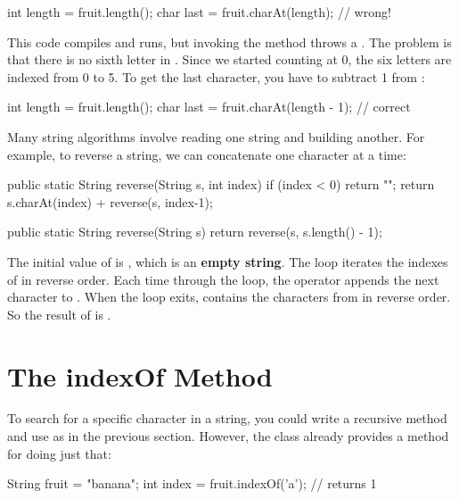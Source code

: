 \begin{code}
int length = fruit.length();
char last = fruit.charAt(length);      // wrong!
\end{code}


This code compiles and runs, but invoking the  method throws a .
The problem is that there is no sixth letter in .
Since we started counting at 0, the six letters are indexed from 0 to 5.
To get the last character, you have to subtract 1 from :

\begin{code}
int length = fruit.length();
char last = fruit.charAt(length - 1);  // correct
\end{code}

Many string algorithms involve reading one string and building another.
For example, to reverse a string, we can concatenate one character at a time:

\begin{code}
public static String reverse(String s, int index) {
    if (index < 0) {
      return "";
    }
    return s.charAt(index) + reverse(s, index-1);
}

public static String reverse(String s) {
    return reverse(s, s.length() - 1);
}
\end{code}


The initial value of  is , which is an {\bf empty string}.
The loop iterates the indexes of  in reverse order.
Each time through the loop, the \java{+=} operator appends the next character to .
When the loop exits,  contains the characters from  in reverse order.
So the result of  is .


\section{The indexOf Method}


To search for a specific character in a string, you could write a recursive method and use  as in the previous section.
However, the  class already provides a method for doing just that:

\begin{code}
String fruit = "banana";
int index = fruit.indexOf('a');     // returns 1
\end{code}

